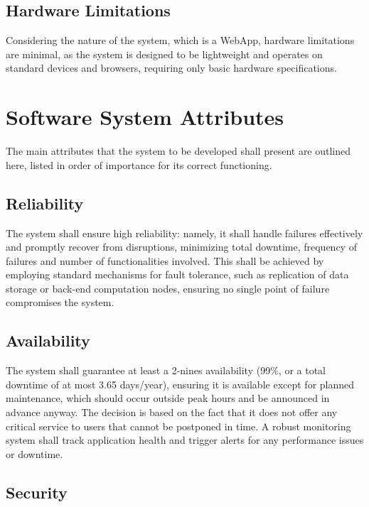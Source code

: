 \subsection{Hardware Limitations}
\label{sec:hardware_limitations}%
Considering the nature of the system, which is a WebApp, hardware limitations are minimal, as the system is designed to be lightweight and operates on standard devices and browsers, requiring only basic hardware specifications.

\section{Software System Attributes}
\label{sec:software_system_attributes}%

The main attributes that the system to be developed shall present are outlined here, listed in order of importance for its correct functioning.

\subsection{Reliability}
\label{sec:reliability}%

The system shall ensure high reliability: namely, it shall handle failures effectively and promptly recover from disruptions, minimizing total downtime, frequency of failures and number of functionalities involved. This shall be achieved by employing standard mechanisms for fault tolerance, such as replication of data storage or back-end computation nodes, ensuring no single point of failure compromises the system.

\subsection{Availability}
\label{sec:availability}%

The system shall guarantee at least a 2-nines availability (99\%, or a total downtime of at most 3.65 days/year), ensuring it is available except for planned maintenance, which should occur outside peak hours and be announced in advance anyway.
The decision is based on the fact that it does not offer any critical service to users that cannot be postponed in time.
A robust monitoring system shall track application health and trigger alerts for any performance issues or downtime.

\subsection{Security}
\label{sec:security}%

